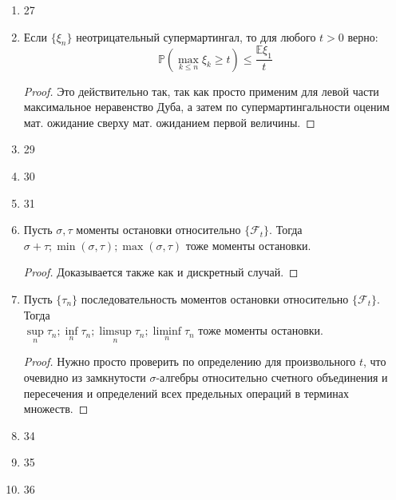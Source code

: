 \documentclass[12pt,a4paper]{article} %
\newcommand{\E}{\mathbb{E}}
\newcommand{\PR}{\mathbb{P}}
\newcommand{\F}{\mathcal{F}}
\begin{document}
\begin{enumerate}
		\begin{proof}
			Мы знаем, что есть предел $\xi_{\infty}$ в смысле п.н. и в $L^1$. Перейдем к обратному субмартингалу, навесив модуль и возведя в степень $p$. Тогда для него снова есть предел в смысле п.н. и в $L^1$, то есть для исходного есть предел в $L^p$.
		\end{proof}
		\item 27
		\item Если $\{\xi_n\}$ неотрицательный супермартингал, то для любого $t>0$ верно:
		$$\PR(\max\limits_{k\leq n}\xi_k\geq t)\leq\frac{\E\xi_1}{t}$$
		\begin{proof}
			Это действительно так, так как просто применим для левой части максимальное неравенство Дуба, а затем по супермартингальности оценим мат. ожидание сверху мат. ожиданием первой величины.
		\end{proof}
		\item 29
		\item 30
		\item 31
		\item Пусть $\sigma,\tau$ моменты остановки относительно $\{\F_t\}$. Тогда $\sigma+\tau;\min(\sigma,\tau);\max(\sigma,\tau)$ тоже моменты остановки.
		\begin{proof}
			Доказывается также как и дискретный случай.
		\end{proof}
		\item Пусть $\{\tau_n\}$ последовательность моментов остановки относительно $\{\F_t\}$. Тогда \\$\sup\limits_n\tau_n;\inf\limits_n\tau_n;\limsup\limits_n\tau_n;\liminf\limits_n\tau_n$ тоже моменты остановки.
		\begin{proof}
			Нужно просто проверить по определению для произвольного $t$, что очевидно из замкнутости $\sigma$-алгебры относительно счетного объединения и пересечения и определений всех предельных операций в терминах множеств.
		\end{proof}
		\item 34
		\item 35
		\item 36
	\end{enumerate}
\end{document}
